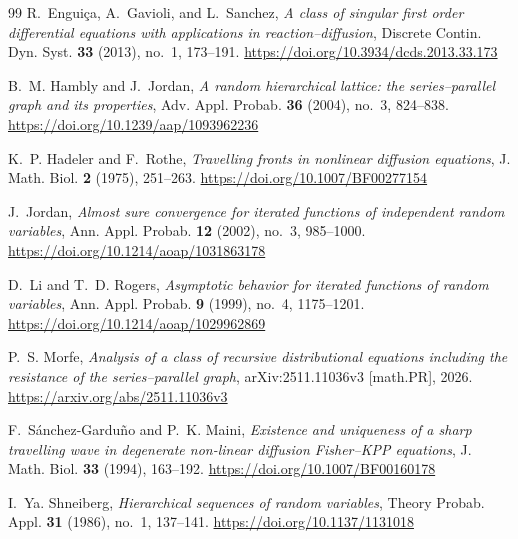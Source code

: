 \documentclass[12pt]{amsart}
\numberwithin{equation}{section}
\theoremstyle{plain}
\theoremstyle{definition}
\begin{document}
\begin{thebibliography}{99}
%
%
R.~Engui\c{c}a, A.~Gavioli, and L.~Sanchez,
\emph{A class of singular first order differential equations with applications
in reaction--diffusion},
Discrete Contin. Dyn. Syst. \textbf{33} (2013), no.~1, 173--191.
\url{https://doi.org/10.3934/dcds.2013.33.173}
%
%

B.~M. Hambly and J.~Jordan,
\emph{A random hierarchical lattice: the series--parallel graph and its
properties},
Adv. Appl. Probab. \textbf{36} (2004), no.~3, 824--838.
\url{https://doi.org/10.1239/aap/1093962236}

K.~P. Hadeler and F.~Rothe,
\emph{Travelling fronts in nonlinear diffusion equations},
J. Math. Biol. \textbf{2} (1975), 251--263.
\url{https://doi.org/10.1007/BF00277154}

J.~Jordan,
\emph{Almost sure convergence for iterated functions of independent random
variables},
Ann. Appl. Probab. \textbf{12} (2002), no.~3, 985--1000.
\url{https://doi.org/10.1214/aoap/1031863178}

D.~Li and T.~D. Rogers,
\emph{Asymptotic behavior for iterated functions of random variables},
Ann. Appl. Probab. \textbf{9} (1999), no.~4, 1175--1201.
\url{https://doi.org/10.1214/aoap/1029962869}

P.~S. Morfe,
\emph{Analysis of a class of recursive distributional equations including the
resistance of the series--parallel graph},
arXiv:2511.11036v3 [math.PR], 2026.
\url{https://arxiv.org/abs/2511.11036v3}

F.~S\'anchez-Gardu\~no and P.~K. Maini,
\emph{Existence and uniqueness of a sharp travelling wave in degenerate
non-linear diffusion Fisher--KPP equations},
J. Math. Biol. \textbf{33} (1994), 163--192.
\url{https://doi.org/10.1007/BF00160178}

I.~Ya. Shneiberg,
\emph{Hierarchical sequences of random variables},
Theory Probab. Appl. \textbf{31} (1986), no.~1, 137--141.
\url{https://doi.org/10.1137/1131018}

\end{thebibliography}
\end{document}
